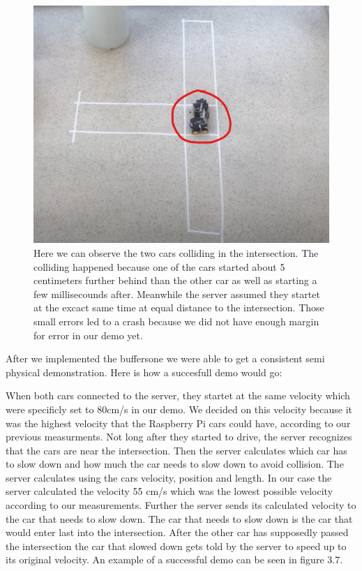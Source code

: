 \begin{figure}[h!]
	\centering
	\includegraphics[width=1\linewidth]{figures/demo_crash}
	\caption[Crash in demo]{Here we can observe the two cars colliding in the intersection. The colliding happened because one of the cars started about 5 centimeters further behind than the other car as well as starting a few millisecounds after. Meanwhile the server assumed they startet at the excact same time at equal distance to the intersection. Those small errors led to a crash because we did not have enough margin for error in our demo yet.}
	\label{fig:crashdemo}
\end{figure}

After we implemented the buffersone we were able to get a consistent semi physical demonstration. Here is how a succesfull demo would go:

When both cars connected to the server, they startet at the same velocity which were specificly set to 80cm/s in our demo. We decided on this velocity because it was the highest velocity that the Raspberry Pi cars could have, according to our previous measurments. Not long after they started to drive, the server recognizes that the cars are near the intersection. Then the server calculates which car has to slow down and how much the car needs to slow down to avoid collision. The server calculates using the cars velocity, position and length. In our case the server calculated the velocity 55 cm/s which was the lowest possible velocity according to our measurements. Further the server sends its calculated velocity to the car that needs to slow down. The car that needs to slow down is the car that would enter last into the intersection. After the other car has supposedly passed the intersection the car that slowed down gets told by the server to speed up to its original velocity. An example of a successful demo can be seen in figure 3.7.


